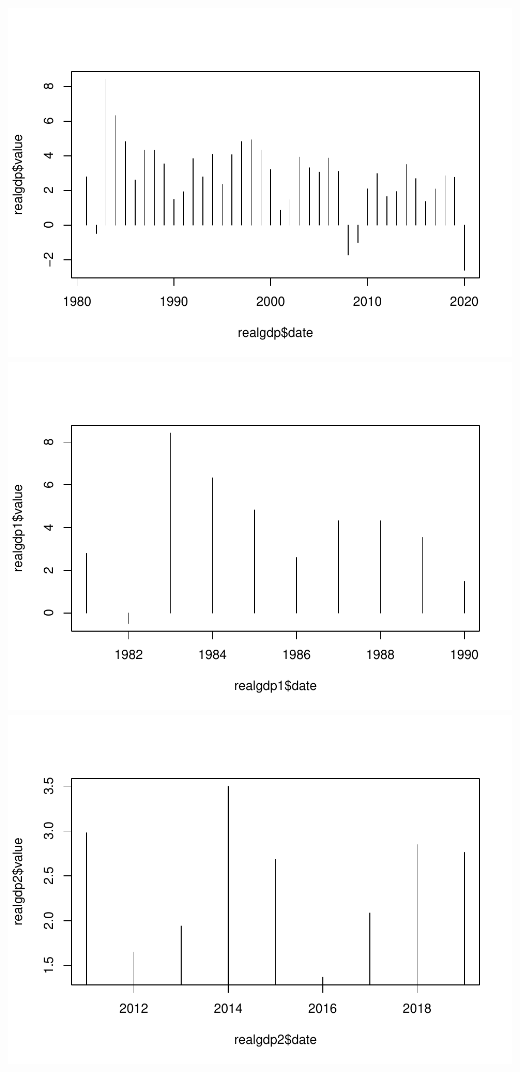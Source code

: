 \documentclass[
]{article}
\begin{document}
\includegraphics{datacollection_files/figure-latex/p1.1-1.pdf}
\includegraphics{datacollection_files/figure-latex/p1.1-2.pdf}
\includegraphics{datacollection_files/figure-latex/p1.1-3.pdf}
\end{document}
